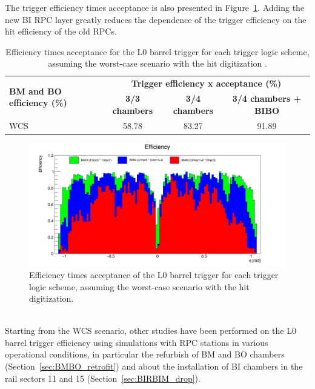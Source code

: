 The trigger efficiency times acceptance is also presented in Figure~\ref{fig:h_eff}. 
Adding the new BI RPC layer greatly reduces the dependence of the trigger efficiency on the hit efficiency of the old RPCs.
\begin{table}[h]
		\small
\begin{tabular}{l|c|c|c}
	\hline
	\multirow{2}{*}{\textbf{BM and BO efficiency (\%)}} & \multicolumn{3}{c}{\textbf{Trigger efficiency x acceptance (\%)}}\\
	\cline{2-4}   
	& \textbf{3/3 chambers} & \textbf{3/4 chambers} & \textbf{3/4 chambers + BIBO}\\
	\hline 
	WCS 												& 58.78 				& 83.27 		& 91.89\\
	\hline 
\end{tabular} 
\caption{Efficiency times acceptance for the L0 barrel trigger for each trigger logic scheme, assuming the worst-case scenario with the hit digitization  .} 
\label{tab:eff_x_acc_wcs}
\end{table} 
\begin{figure}[!h]
	\centering
	\includegraphics[width=1.1\textwidth]{Chapters/CH3/figures/h_eff}
	\caption{Efficiency times acceptance of the L0 barrel trigger for each trigger logic scheme, assuming the worst-case scenario with the hit digitization.}
	\label{fig:h_eff}
\end{figure}
\\Starting from the WCS scenario, other studies have been performed on the L0 barrel trigger 
efficiency using simulations with RPC stations in various operational conditions, in particular the 
refurbish of BM and BO chambers (Section~\ref{sec:BMBO_retrofit}) and about the installation of BI chambers in the rail sectors 11 and 15 (Section~\ref{sec:BIRBIM_drop}).

